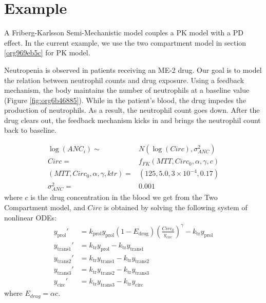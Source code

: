 \documentclass[11pt, reqno, oneside]{amsbook}
\numberwithin{equation}{chapter}
\numberwithin{figure}{chapter}
\numberwithin{table}{chapter}
\theoremstyle{remark}
\begin{document}
\section{Example}
\label{sec:org8b96ec3}

A Friberg-Karlsson Semi-Mechanistic model \cite{friberg_mechanistic_2003} couples
a PK model with a PD
effect. In the current example, we use the two compartment model in section \ref{org969eb5c} for
PK model.

Neutropenia is observed in patients receiving an ME-2 drug. Our goal
is to model the relation between neutrophil counts and drug
exposure. Using a feedback mechanism, the body maintains the number of
neutrophils at a baseline value (Figure \ref{fig:org6b46885}). While in the
patient's blood, the drug impedes the production of neutrophils. As a
result, the neutrophil count goes down. After the drug clears out, the
feedback mechanism kicks in and brings the neutrophil count back to
baseline.

\begin{align}
  \log(ANC_i) \sim& N(\log(Circ), \sigma^2_{ANC})  \\
  Circ =& f_{FK}(MTT, Circ_{0}, \alpha, \gamma, c)  \\
  (MTT, Circ_{0}, \alpha, \gamma, ktr) =& (125, 5.0, 3 \times 10^{-4}, 0.17) \\
  \sigma^2_{ANC} =& 0.001
\end{align}
where \(c\) is the drug concentration in the blood we get from the Two
Compartment model, and \(Circ\) is obtained by solving the following
system of nonlinear ODEs:
\begin{subequations}
  \begin{align}
   y_\mathrm{prol}' &= k_\mathrm{prol} y_\mathrm{prol} (1 - E_\mathrm{drug})\left(\frac{Circ_0}{y_\mathrm{circ}}\right)^\gamma - k_\mathrm{tr}y_\mathrm{prol} \\
   y_\mathrm{trans1}' &= k_\mathrm{tr} y_\mathrm{prol} - k_\mathrm{tr} y_\mathrm{trans1} \\
   y_\mathrm{trans2}' &= k_\mathrm{tr} y_\mathrm{trans1} - k_\mathrm{tr} y_\mathrm{trans2}  \\
   y_\mathrm{trans3}' &= k_\mathrm{tr} y_\mathrm{trans2} - k_\mathrm{tr} y_\mathrm{trans3}  \\
   y_\mathrm{circ}' &= k_\mathrm{tr} y_\mathrm{trans3} - k_\mathrm{tr} y_\mathrm{circ}
   \end{align}
   \label{eq:FK}
\end{subequations}
where \(E_{drug}  = \alpha c\).
\end{document}
